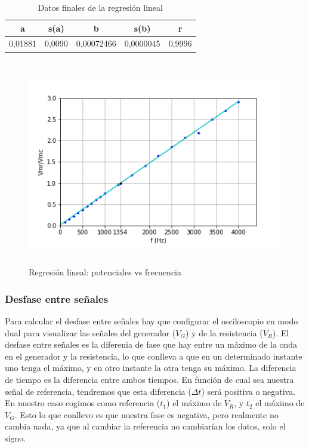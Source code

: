 \documentclass[10pt,a4paper]{article}
\begin{document}
\newpage 

\begin{table}[h] %
\begin{center}
\begin{tabular}{|c|c|c|c|c|}
\hline
a & s(a) & b & s(b) & r 
  \\ \hline
0,01881 & 0,0090 & 0,00072466 & 0,0000045 & 0,9996 \\
\hline
\end{tabular}
\end{center}
\label{Datos de la regresión lineal}
\caption{Datos finales de la regresión lineal}
\end{table}

\begin{figure}[h!] %
\centering
\includegraphics[width=12cm, height=9cm]{Plot1}
\caption{Regresión lineal: potenciales vs frecuencia}
\label{fig: Potenciales vs frecuencia}
\end{figure}



\subsubsection{Desfase entre señales}

Para calcular el desfase entre señales hay que configurar el osciloscopio en modo dual para visualizar las señales del generador ($V_G$) y de la resistencia ($V_R$). El desfase entre señales es la diferenia de fase que hay entre un máximo de la onda en el generador y la resistencia, lo que conlleva a que en un determinado instante uno tenga el máximo, y en otro instante la otra tenga su máximo. La diferencia de tiempo es la diferencia entre ambos tiempos. En función de cual sea nuestra señal de referencia, tendremos que esta diferencia ($\Delta t$) será positiva o negativa. En nuestro caso cogimos como referencia ($t_1$) el máximo de $V_R$, y $t_2$  el máximo de $V_G$. Esto lo que conllevo es que nuestra fase es negativa, pero realmente no cambia nada, ya que al  cambiar la referencia no cambiarían los datos, solo el signo. \\
\end{document}
